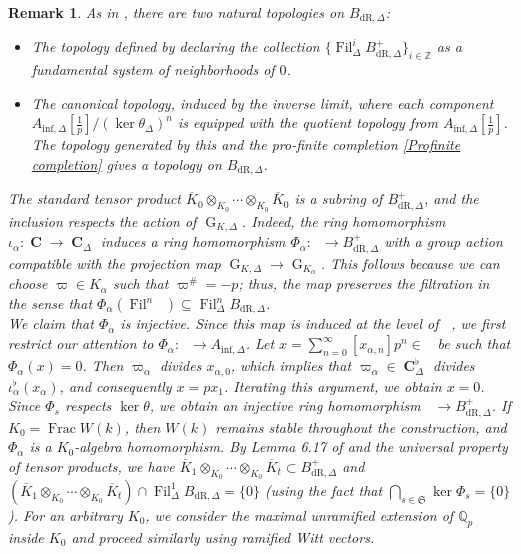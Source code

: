 \documentclass{amsart}
\newtheorem{remark}[proposition]{Remark}
\DeclareMathOperator{\Frac}{Frac}
\newcommand{\mAinf}{A_{\mathrm{inf},\Delta}}
\DeclareMathOperator{\Ainf}{A_{inf}}
\DeclareMathOperator{\C}{\textbf{C}}
\DeclareMathOperator{\Bdr}{B_{dR}}
\newcommand{\mBdrp}{B^+_{\mathrm{dR},\Delta}}
\DeclareMathOperator{\Bdrp}{B^+_{dR}}
\newcommand{\mBdr}{B_{\mathrm{dR},\Delta}}
\DeclareMathOperator{\G}{G}
\DeclareMathOperator{\Fil}{Fil}
\begin{document}
\begin{remark}
    As in \cite{Fontaine}, there are two natural topologies on $\mBdr$:
    \begin{itemize}
        \item The topology defined by declaring the collection $\{\Fil^i_\Delta \mBdrp\}_{i \in \mathbb{Z}}$ as a fundamental system of neighborhoods of $0$.
        \item The \emph{canonical topology}, induced by the inverse limit, where each component $\mAinf[\frac{1}{p}] / (\ker \theta_\Delta)^n$ is equipped with the quotient topology from $\mAinf[\frac{1}{p}]$. The topology generated by this and the pro-finite completion \ref{Profinite completion} gives a topology on $\mBdr$.
    \end{itemize}

    The standard tensor product $\overline{K}_0 \otimes_{K_0} \cdots \otimes_{K_0} \overline{K}_0$ is a subring of $\mBdrp$, and the inclusion respects the action of $\G_{K,\Delta}$. Indeed, the ring homomorphism $\iota_\alpha: \C \to \C_\Delta$ induces a ring homomorphism $\Phi_\alpha: \Bdrp \to \mBdrp$ with a group action compatible with the projection map $\G_{K,\Delta} \to \G_{K_\alpha}$. This follows because we can choose $\varpi \in K_\alpha$ such that $\varpi^\# = -p$; thus, the map preserves the filtration in the sense that $\Phi_\alpha(\Fil^n \Bdr) \subseteq \Fil^n_\Delta \mBdr$. \\

    We claim that $\Phi_\alpha$ is injective. Since this map is induced at the level of $\Ainf$, we first restrict our attention to $\Phi_\alpha: \Ainf \to \mAinf$. Let $x = \sum\limits_{n=0}^\infty [x_{\alpha,n}] p^n \in \Ainf$ be such that $\Phi_\alpha(x) = 0$. Then $\varpi_\alpha$ divides $x_{\alpha,0}$, which implies that $\varpi_\alpha \in \C^\flat_\Delta$ divides $\iota^\flat_\alpha(x_\alpha)$, and consequently $x = px_1$. Iterating this argument, we obtain $x = 0$. \\

    Since $\Phi_s$ respects $\ker \theta$, we obtain an injective ring homomorphism $\Bdrp \to \mBdrp$. If $K_0 = \Frac W(k)$, then $W(k)$ remains stable throughout the construction, and $\Phi_\alpha$ is a $K_0$-algebra homomorphism. By Lemma 6.17 of \cite{Fontaine} and the universal property of tensor products, we have $\overline{K}_1 \otimes_{K_0} \cdots \otimes_{K_0} \overline{K}_t \subset \mBdrp$ and $(\overline{K}_1 \otimes_{K_0} \cdots \otimes_{K_0} \overline{K}_t) \cap \Fil^1_\Delta \mBdr = \{0\}$ (using the fact that $\bigcap_{s \in \mathfrak{S}} \ker \Phi_s = \{0\}$). For an arbitrary $K_0$, we consider the maximal unramified extension of $\mathbb{Q}_p$ inside $K_0$ and proceed similarly using ramified Witt vectors.
\end{remark}
\end{document}
